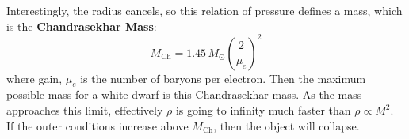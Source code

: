 \documentclass[10pt]{article}
\numberwithin{equation}{section}
\newcommand{\n}{\noindent}
\begin{document}
    Interestingly, the radius cancels, so this relation of pressure
    defines a mass, which is the \textbf{Chandrasekhar Mass}:
    \begin{equation}
      \label{eq:316}
      M_{\mathrm{Ch}}=1.45\,M_\odot\left(\frac{2}{\mu_e}\right)^2
    \end{equation}
    where gain, $\mu_e$ is the number of baryons per electron. Then
    the maximum possible mass for a white dwarf is this Chandrasekhar
    mass. As the mass approaches this limit, effectively $\rho$ is
    going to infinity much faster than $\rho\propto M^2$.\\

    \n If the outer conditions increase above $M_{\mathrm{Ch}}$, then
    the object will collapse.
\end{document}

